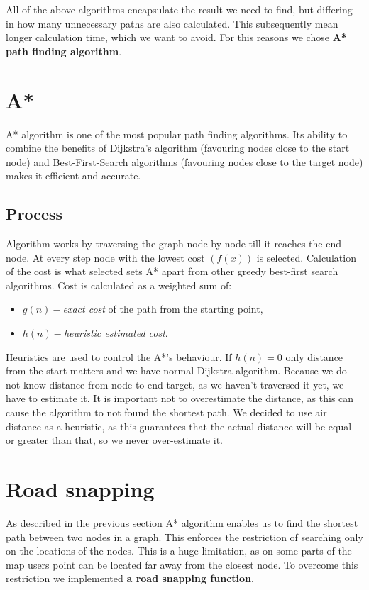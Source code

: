 \documentclass[reqno,openany,12pt]{amsbook}
\theoremstyle{definition}
\theoremstyle{remark}
\begin{document}
All of the above algorithms encapsulate the result we need to find, but differing in how many unnecessary paths are also calculated. This subsequently mean longer calculation time, which we want to avoid. For this reasons we chose \textbf{A* path finding algorithm}.

\section{A*}
A* algorithm is one of the most popular path finding algorithms. Its ability to combine the benefits of Dijkstra's algorithm (favouring nodes close to the start node) and Best-First-Search algorithms (favouring nodes close to the target node) makes it efficient and accurate. 
\subsection{Process}
Algorithm works by traversing the graph node by node till it reaches the end node. At every step node with the lowest cost $(f(x))$ is selected. Calculation of the cost is what selected sets A* apart from other greedy best-first search algorithms. Cost is calculated as a weighted sum of:
\begin{itemize}
\item $g(n) - $\textit{exact cost} of the path from the starting point,
\item $h(n) - $\textit{heuristic estimated cost}.
\end{itemize}
Heuristics are used to control the A*'s behaviour. If $h(n)=0$ only distance from the start matters and we have 
normal Dijkstra algorithm. Because we do not know distance from node to end target, as we haven't traversed it yet, we have to estimate it. It is important not to overestimate the distance, as this can cause the algorithm to not found the shortest path. We decided to use air distance as a heuristic, as this guarantees that the actual distance will be equal or greater than that, so we never over-estimate it.

\section{Road snapping}
As described in the previous section A* algorithm enables us to find the shortest path between two nodes in a graph. This enforces the restriction of searching only on the locations of the nodes. This is a huge limitation, as on some parts of the map users point can be located far away from the closest node. To overcome this restriction we implemented \textbf{a road snapping function}.\\
\end{document}
